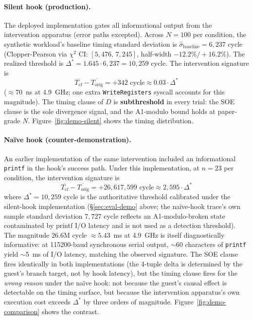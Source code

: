 \documentclass[conference]{IEEEtran}
\newcommand{\sigbase}{\hat{\sigma}_\text{baseline}}
\newcommand{\Dstar}{\Delta^{*}}
\begin{document}
\paragraph{Silent hook (production).} The deployed implementation
gates all informational output from the intervention apparatus
(error paths excepted). Across $N{=}100$ per condition, the
synthetic workload's baseline timing standard deviation is
$\sigbase = 6{,}237$ cycle (Clopper-Pearson via $\chi^2$ CI:
$[5{,}476,\, 7{,}245]$, half-width $-12.2\%/+16.2\%$). The realized
threshold is $\Dstar = 1.645 \cdot 6{,}237 = 10{,}259$ cycle. The
intervention signature is
\begin{equation*}
\overline{T_\text{cf}} - \overline{T_\text{orig}} = +342 \text{ cycle} \approx 0.03 \cdot \Dstar
\end{equation*}
(${\approx}70$~ns at 4.9~GHz; one extra \texttt{WriteRegisters}
syscall accounts for this magnitude). The timing clause of $D$ is
\textbf{subthreshold} in every trial: the SOE clause is the sole
divergence signal, and the A1-modulo bound holds at paper-grade
$N$. Figure~\ref{fig:demo-silent} shows the timing distribution.

\paragraph{Naïve hook (counter-demonstration).} An earlier
implementation of the same intervention included an informational
\texttt{printf} in the hook's success path. Under this
implementation, at $n{=}23$ per condition, the intervention
signature is
\begin{equation*}
\overline{T_\text{cf}} - \overline{T_\text{orig}} = +26{,}617{,}599 \text{ cycle} \approx 2{,}595 \cdot \Dstar
\end{equation*}
where $\Dstar = 10{,}259$ cycle is the authoritative threshold
calibrated under the silent-hook implementation
(\S\ref{sec:eval-demo} above; the naïve-hook trace's own sample
standard deviation $7{,}727$ cycle reflects an A1-modulo-broken
state contaminated by printf I/O latency and is not used as a
detection threshold). The magnitude
$26.6$M cycle $\approx 5.43$~ms at 4.9~GHz is itself
diagnostically informative: at 115200-baud synchronous serial
output, $\sim$60 characters of \texttt{printf} yield $\sim$5~ms
of I/O latency, matching the observed signature. The SOE clause
fires identically in both implementations (the 4-tuple delta is
determined by the guest's branch target, not by hook latency),
but the timing clause fires for the \emph{wrong reason} under the
naïve hook: not because the guest's causal effect is detectable
on the timing surface, but because the intervention apparatus's
own execution cost exceeds $\Dstar$ by three orders of magnitude.
Figure~\ref{fig:demo-comparison} shows the contrast.
\end{document}
